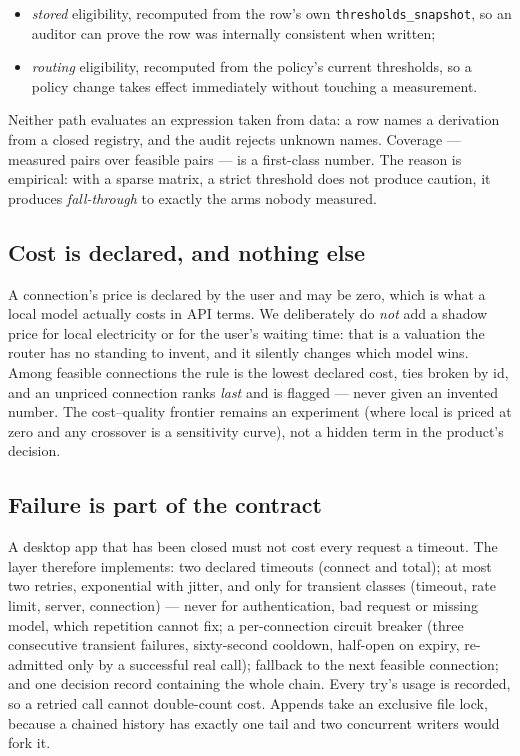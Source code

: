 \documentclass[11pt]{article}
\newcommand{\code}[1]{\texttt{#1}}
\begin{document}
\begin{itemize}
\item \emph{stored} eligibility, recomputed from the row's own \code{thresholds\_snapshot}, so an
auditor can prove the row was internally consistent when written;
\item \emph{routing} eligibility, recomputed from the policy's current thresholds, so a policy
change takes effect immediately without touching a measurement.
\end{itemize}

Neither path evaluates an expression taken from data: a row names a derivation from a closed
registry, and the audit rejects unknown names. Coverage --- measured pairs over feasible pairs
--- is a first-class number. The reason is empirical: with a sparse matrix, a strict threshold
does not produce caution, it produces \emph{fall-through} to exactly the arms nobody measured.

\subsection{Cost is declared, and nothing else}

A connection's price is declared by the user and may be zero, which is what a local model
actually costs in API terms. We deliberately do \emph{not} add a shadow price for local
electricity or for the user's waiting time: that is a valuation the router has no standing to
invent, and it silently changes which model wins. Among feasible connections the rule is the
lowest declared cost, ties broken by id, and an unpriced connection ranks \emph{last} and is
flagged --- never given an invented number. The cost--quality frontier remains an experiment
(where local is priced at zero and any crossover is a sensitivity curve), not a hidden term in
the product's decision.

\subsection{Failure is part of the contract}
\label{sec:resilience}

A desktop app that has been closed must not cost every request a timeout. The layer therefore
implements: two declared timeouts (connect and total); at most two retries, exponential with
jitter, and only for transient classes (timeout, rate limit, server, connection) --- never for
authentication, bad request or missing model, which repetition cannot fix; a per-connection
circuit breaker (three consecutive transient failures, sixty-second cooldown, half-open on
expiry, re-admitted only by a successful real call); fallback to the next feasible connection;
and one decision record containing the whole chain. Every try's usage is recorded, so a retried
call cannot double-count cost. Appends take an exclusive file lock, because a chained history has
exactly one tail and two concurrent writers would fork it.
\end{document}
